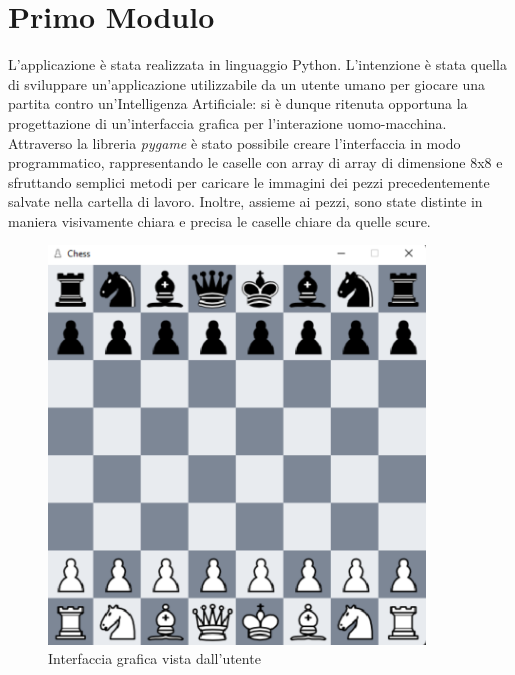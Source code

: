 \section{Primo Modulo}
L'applicazione è stata realizzata in linguaggio Python. L'intenzione è stata quella di sviluppare un'applicazione utilizzabile da un utente umano per giocare una partita contro un'Intelligenza Artificiale: si è dunque ritenuta opportuna la progettazione di un'interfaccia grafica per l'interazione uomo-macchina. Attraverso la libreria \textit{pygame} è stato possibile creare l'interfaccia in modo programmatico, rappresentando le caselle con array di array di dimensione 8x8 e sfruttando semplici metodi per caricare le immagini dei pezzi precedentemente salvate nella cartella di lavoro. Inoltre, assieme ai pezzi, sono state distinte in maniera visivamente chiara e precisa le caselle chiare da quelle scure. 
\begin{figure}[!htb]
    \includegraphics[width=10cm]{frontmatter/figure/scacchiera_gui.pdf}
    \centering
    \caption{Interfaccia grafica vista dall'utente}
    \label{fig:scacchiera_gui}
\end{figure}
\newpage

